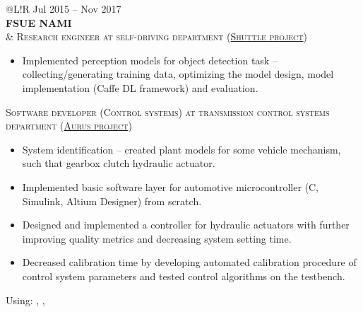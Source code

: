  \begin{tabular}{@{}L!{\VRule}R}
    Jul 2015 -- Nov 2017                                                                                                       \\ {\bf FSUE NAMI} \\  &
    {\textsc{Research engineer at self-driving department (\href{https://www.engadget.com/2016/08/28/yandex-teams-on-self-driving-shuttle-bus/}{Shuttle project})}}
    \begin{itemize}
        \item Implemented perception models for object detection task -- collecting/generating training data, optimizing the model design, model implementation (Caffe DL framework) and evaluation.
    \end{itemize}
    \textsc{Software developer (Control systems) at transmission control systems department (\href{https://en.wikipedia.org/wiki/Aurus_Senat}{Aurus project})}
    \begin{itemize}
        \item System identification -- created plant models for some vehicle mechanism, such that gearbox clutch hydraulic actuator.
        \item Implemented basic software layer for automotive microcontroller (C, Simulink, Altium Designer) from scratch.
        \item Designed and implemented a controller for hydraulic actuators with further improving quality metrics and decreasing system setting time.
        \item Decreased calibration time by developing automated calibration procedure of control system parameters and tested control algorithms on the testbench.
    \end{itemize}
    Using: , ,                                                                                                 \\  
\end{tabular}                                                                                                \\
